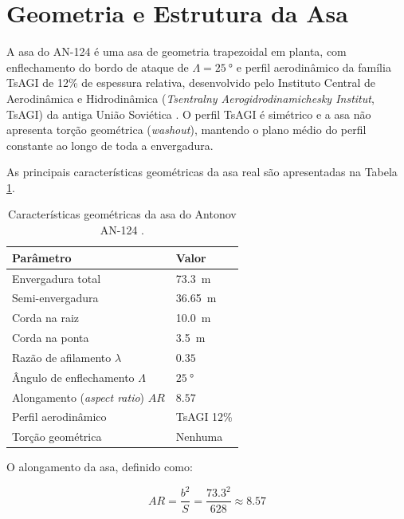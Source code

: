 \documentclass[11pt,twoside,a4paper]{report}
\begin{document}
\section{Geometria e Estrutura da Asa}

A asa do AN-124 é uma asa de geometria trapezoidal em planta, com enflechamento do bordo de ataque de $\Lambda = \qty{25}{\degree}$ e perfil aerodinâmico da família TsAGI de 12\% de espessura relativa, desenvolvido pelo Instituto Central de Aerodinâmica e Hidrodinâmica (\textit{Tsentralny Aerogidrodinamichesky Institut}, TsAGI) da antiga União Soviética \cite{Gordon2008, GarciaFernandez2025}. O perfil TsAGI é simétrico e a asa não apresenta torção geométrica (\textit{washout}), mantendo o plano médio do perfil constante ao longo de toda a envergadura.

As principais características geométricas da asa real são apresentadas na Tabela \ref{tab:asa_specs}.

\begin{table}[h!]
\centering
\caption{Características geométricas da asa do Antonov AN-124 
\cite{GarciaFernandez2025, Gordon2008}.}
\label{tab:asa_specs}
\renewcommand{\arraystretch}{1.4}
\begin{tabularx}{\textwidth}{p{5.5cm} X}
\toprule
\textbf{Parâmetro} & \textbf{Valor} \\
\midrule
Envergadura total & \SI{73.3}{\meter} \\
Semi-envergadura & \SI{36.65}{\meter} \\
Corda na raiz & \SI{10.0}{\meter} \\
Corda na ponta & \SI{3.5}{\meter} \\
Razão de afilamento $\lambda$ & $0.35$ \\
Ângulo de enflechamento $\Lambda$ & $\qty{25}{\degree}$ \\
Alongamento (\textit{aspect ratio}) $AR$ & $8.57$ \\
Perfil aerodinâmico & TsAGI 12\% \\
Torção geométrica & Nenhuma \\
\bottomrule
\end{tabularx}
\end{table}

O alongamento da asa, definido como:

\begin{equation}
    AR = \frac{b^2}{S} = \frac{73.3^2}{628} \approx 8.57
    \label{eq:aspect_ratio}
\end{equation}
\end{document}
